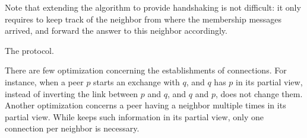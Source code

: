Note that extending the algorithm to provide handshaking is not difficult: it
only requires to keep track of the neighbor from where the membership messages
arrived, and forward the answer to this neighbor accordingly.

\begin{algorithm}
  
  \caption{\label{algo:scamplon}The \SCAMPLON{} protocol.}
\end{algorithm}

There are few optimization concerning the establishments of connections. For
instance, when a peer $p$ starts an exchange with $q$, and $q$ has $p$ in its
partial view, instead of inverting the link between $p$ and $q$, and $q$ and
$p$, \SCAMPLON{} does not change them. Another optimization concerns a peer
having a neighbor multiple times in its partial view. While \SCAMPLON{} keeps
such information in its partial view, only one connection per neighbor is
necessary.


